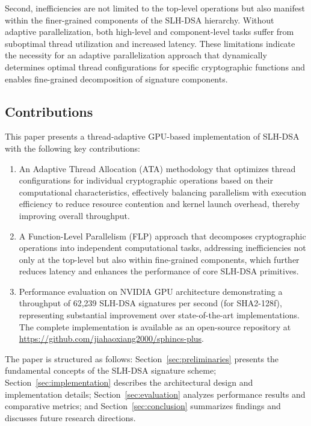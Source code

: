 \documentclass[journal]{IEEEtran}
\begin{document}
Second, inefficiencies are not limited to the top-level operations but also manifest within the finer-grained components of the SLH-DSA hierarchy. Without adaptive parallelization, both high-level and component-level tasks suffer from suboptimal thread utilization and increased latency. These limitations indicate the necessity for an adaptive parallelization approach that dynamically determines optimal thread configurations for specific cryptographic functions and enables fine-grained decomposition of signature components.

\subsection{Contributions}

This paper presents a thread-adaptive GPU-based implementation of SLH-DSA with the following key contributions:

\begin{enumerate}
  \item An Adaptive Thread Allocation (ATA) methodology that optimizes thread configurations for individual cryptographic operations based on their computational characteristics, effectively balancing parallelism with execution efficiency to reduce resource contention and kernel launch overhead, thereby improving overall throughput.

  \item A Function-Level Parallelism (FLP) approach that decomposes cryptographic operations into independent computational tasks, addressing inefficiencies not only at the top-level but also within fine-grained components, which further reduces latency and enhances the performance of core SLH-DSA primitives.

  \item Performance evaluation on NVIDIA GPU architecture demonstrating a throughput of 62,239 SLH-DSA signatures per second (for SHA2-128f), representing substantial improvement over state-of-the-art implementations.
    The complete implementation is available as an open-source repository at \url{https://github.com/jiahaoxiang2000/sphincs-plus}.
\end{enumerate}

The paper is structured as follows: Section~\ref{sec:preliminaries} presents the fundamental concepts of the SLH-DSA signature scheme; Section~\ref{sec:implementation} describes the architectural design and implementation details; Section~\ref{sec:evaluation} analyzes performance results and comparative metrics; and Section~\ref{sec:conclusion} summarizes findings and discusses future research directions.
\end{document}
